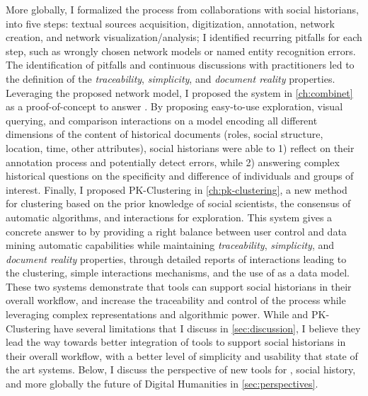 More globally, I formalized the \hsna process from collaborations with social historians, into five steps: textual sources acquisition, digitization, annotation, network creation, and network visualization/analysis; I identified recurring pitfalls for each step, such as wrongly chosen network models or named entity recognition errors.
The identification of pitfalls and continuous discussions with practitioners led to the definition of the \emph{traceability}, \emph{simplicity}, and \emph{document reality} properties.
Leveraging the proposed network model, I proposed the \combinet system in \autoref{ch:combinet} as a proof-of-concept to answer \qtwo.
By proposing easy-to-use exploration, visual querying, and comparison interactions on a model encoding all different dimensions of the content of historical documents (roles, social structure, location, time, other attributes), social historians were able to 1) reflect on their annotation process and potentially detect errors, while 2) answering complex historical questions on the specificity and difference of individuals and groups of interest.
Finally, I proposed PK-Clustering in \autoref{ch:pk-clustering}, a new method for clustering based on the prior knowledge of social scientists, the consensus of automatic algorithms, and interactions for exploration.
This system gives a concrete answer to \qthree by providing a right balance between user control and data mining automatic capabilities while maintaining \emph{traceability}, \emph{simplicity}, and \emph{document reality} properties, through detailed reports of interactions leading to the clustering, simple interactions mechanisms, and the use of \modelplural as a data model.
These two systems demonstrate that \va tools can support social historians in their overall workflow, and increase the traceability and control of the process while leveraging complex representations and algorithmic power.
While \combinet and PK-Clustering have several limitations that I discuss in \autoref{sec:discussion}, I believe they lead the way towards better integration of \va tools to support social historians in their overall workflow, with a better level of simplicity and usability that state of the art systems.
Below, I discuss the perspective of new \va tools for \hsna, social history, and more globally the future of Digital Humanities in \autoref{sec:perspectives}.








